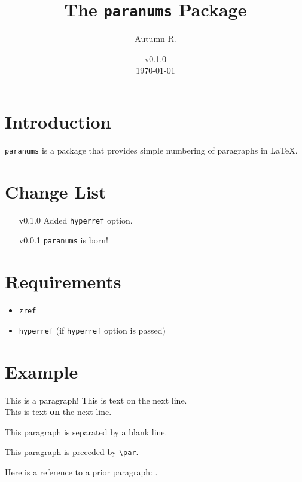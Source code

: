 \documentclass{article}
\title{The \texttt{paranums} Package}
\author{Autumn R.}
\date{
    v0.1.0 \\\vspace{3pt}
    \today{}
}
\begin{document}
    \maketitle
    \tableofcontents
    \newpage

    \section{Introduction}
        \texttt{paranums} is a package that provides simple numbering of paragraphs in \LaTeX.

    \section{Change List}
        \begin{itemize}
            \item[v0.1.0] Added \texttt{hyperref} option.
            \item[v0.0.1] \texttt{paranums} is born!
        \end{itemize}

    \section{Requirements}
        \begin{itemize}
            \item \texttt{zref}
            \item \texttt{hyperref} (if \texttt{hyperref} option is passed)
        \end{itemize}

    \section{Example}
        \begin{paranums}
            This is a paragraph!
            This is text on the next line. \\
            This is text \textbf{on} the next line.

            This paragraph is separated by a blank line.  \par
            This paragraph is preceded by \verb|\par|.

            Here is a reference to a prior paragraph: .
        \end{paranums}

        \vspace{10pt}
\end{document}
